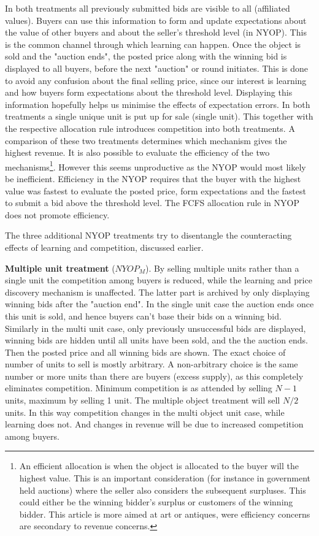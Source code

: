 \documentclass[a4paper,12pt]{article}
\begin{document}
	In both treatments all previously submitted bids are visible to all (affiliated values). Buyers can use this information to form and update expectations about the value of other buyers and about the seller's threshold level (in NYOP). This is the common channel through which learning can happen. Once the object is sold and the "auction ends", the posted price along with the winning bid is displayed to all buyers, before the next "auction" or round initiates. This is done to avoid any confusion about the final selling price, since our interest is learning and how buyers form expectations about the threshold level. Displaying this information hopefully helps us minimise the effects of expectation errors. 
	In both treatments a single unique unit is put up for sale (single unit). This together with the respective allocation rule introduces competition into both treatments. A comparison of these two treatments determines which mechanism gives the highest revenue. It is also possible to evaluate the efficiency of the two mechanisms\footnote{An efficient allocation is when the object is allocated to the buyer will the highest value. This is an important consideration (for instance in government held auctions) where the seller also considers the subsequent surpluses. This could either be the winning bidder's surplus or customers of the winning bidder. This article is more aimed at art or antiques, were efficiency concerns are secondary to revenue concerns.}. However this seems unproductive as the NYOP would most likely be inefficient. Efficiency in the NYOP requires that the buyer with the highest value was fastest to evaluate the posted price, form expectations and the fastest to submit a bid above the threshold level. The FCFS allocation rule in NYOP does not promote efficiency. 

	The three additional NYOP treatments try to disentangle the counteracting effects of learning and competition, discussed earlier.

	{\bf Multiple unit treatment} ($NYOP_M$). 
	By selling multiple units rather than a single unit the competition among buyers is reduced, while the learning and price discovery mechanism is unaffected. The latter part is archived by only displaying winning bids after the "auction end". In the single unit case the auction ends once this unit is sold, and hence buyers can't base their bids on a winning bid. Similarly in the multi unit case, only previously unsuccessful bids are displayed, winning bids are hidden until all units have been sold, and the the auction ends. Then the posted price and all winning bids are shown. The exact choice of number of units to sell is mostly arbitrary. A non-arbitrary choice is the same number or more units than there are buyers (excess supply), as this completely eliminates competition. Minimum competition is as attended by selling $N-1$ units, maximum by selling 1 unit. The multiple object treatment will sell $N/2$ units. In this way competition changes in the multi object unit case, while learning does not. And changes in revenue will be due to increased competition among buyers.
\end{document}
